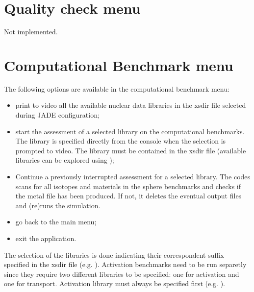 \documentclass[letterpaper,10pt,english]{sphinxmanual}
\let\sphinxpxdimen\pdfpxdimen\else\newdimen\sphinxpxdimen
\begin{document}
\section{Quality check menu}
\label{\detokenize{usage/menu:quality-check-menu}}
\sphinxAtStartPar
Not implemented.


\section{Computational Benchmark menu}
\label{\detokenize{usage/menu:computational-benchmark-menu}}\label{\detokenize{usage/menu:compmenu}}
\noindent\sphinxincludegraphics[width=400\sphinxpxdimen]{{compmenu}.png}

\sphinxAtStartPar
The following options are available in the computational benchmark menu:
\begin{itemize}
\item {} 
\sphinxAtStartPar
{} print to video all the available nuclear data libraries
in the xsdir file selected during JADE configuration;

\item {} 
\sphinxAtStartPar
{} start the assessment of a selected library on the computational benchmarks. The library is
specified directly from the console when the selection is prompted to
video. The library must be contained in the xsdir file (available libraries
can be explored using );

\item {} 
\sphinxAtStartPar
{}  Continue a previously interrupted assessment for a selected
library. The codes scans for all isotopes and materials in the sphere benchmarks
and checks if the mctal file has been produced. If not, it deletes the eventual
output files and (re)runs the simulation.

\item {} 
\sphinxAtStartPar
{} go back to the main menu;

\item {} 
\sphinxAtStartPar
{} exit the application.

\end{itemize}

\sphinxAtStartPar
The selection of the libraries is done indicating their correspondent suffix specified in the xsdir file
(e.g. ). Activation benchmarks need to be run separetly since they require two different libraries
to be specified: one for activation and one for transport. Activation library must always be specified
first (e.g. ).
\end{document}
